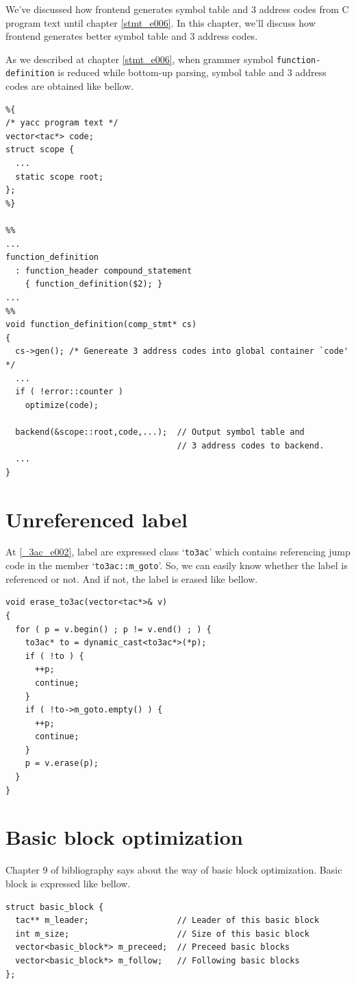 \label{optimize_e051}

We've discussed how frontend generates symbol table and 3 address codes
from C program text until chapter \ref{stmt_e006}. In this chapter,
we'll discuss how frontend generates better symbol table and 3 address codes.

As we described at chapter \ref{stmt_e006},
when grammer symbol {\tt{function-definition}} is reduced
while bottom-up parsing, symbol table and 3 address codes are obtained
like bellow.

\begin{verbatim}
%{
/* yacc program text */
vector<tac*> code;
struct scope {
  ...
  static scope root;
};
%}

%%
...
function_definition
  : function_header compound_statement
    { function_definition($2); }
...
%%
void function_definition(comp_stmt* cs)
{
  cs->gen(); /* Genereate 3 address codes into global container `code' */
  ...
  if ( !error::counter )
    optimize(code);

  backend(&scope::root,code,...);  // Output symbol table and
                                   // 3 address codes to backend.
  ...
}
\end{verbatim}

\section{Unreferenced label}
\label{optimize_e003}
At \ref{_3ac_e002}, label are expressed class `{\tt{to3ac}}'
which contains referencing jump code in the member `{\tt{to3ac::m\_goto}}'.
So, we can easily know whether the label is referenced or not.
And if not, the label is erased like bellow.
\begin{verbatim}
void erase_to3ac(vector<tac*>& v)
{
  for ( p = v.begin() ; p != v.end() ; ) {
    to3ac* to = dynamic_cast<to3ac*>(*p);
    if ( !to ) {
      ++p;
      continue; 
    }
    if ( !to->m_goto.empty() ) {
      ++p;
      continue; 
    }
    p = v.erase(p);
  }
}
\end{verbatim}

\section{Basic block optimization}
\label{optimize_e058}
Chapter 9 of bibliography \cite{doragon} says about 
the way of basic block optimization. Basic block
is expressed like bellow.
\begin{verbatim}
struct basic_block {
  tac** m_leader;                  // Leader of this basic block
  int m_size;                      // Size of this basic block
  vector<basic_block*> m_preceed;  // Preceed basic blocks
  vector<basic_block*> m_follow;   // Following basic blocks
};
\end{verbatim}

